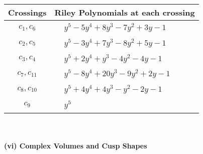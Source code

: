 \documentclass[1p]{elsarticle_modified}
\theoremstyle{definition}
\begin{document}
\begin{tabular}{m{50pt}|m{274pt}}
Crossings & \hspace{64pt}Riley Polynomials at each crossing \\
\hline $$\begin{aligned}c_{1},c_{6}\end{aligned}$$&$\begin{aligned}
&y^5-5 y^4+8 y^3-7 y^2+3 y-1
\end{aligned}$\\
\hline $$\begin{aligned}c_{2},c_{5}\end{aligned}$$&$\begin{aligned}
&y^5-3 y^4+7 y^3-8 y^2+5 y-1
\end{aligned}$\\
\hline $$\begin{aligned}c_{3},c_{4}\end{aligned}$$&$\begin{aligned}
&y^5+2 y^4+y^3-4 y^2-4 y-1
\end{aligned}$\\
\hline $$\begin{aligned}c_{7},c_{11}\end{aligned}$$&$\begin{aligned}
&y^5-8 y^4+20 y^3-9 y^2+2 y-1
\end{aligned}$\\
\hline $$\begin{aligned}c_{8},c_{10}\end{aligned}$$&$\begin{aligned}
&y^5+4 y^4+4 y^3- y^2-2 y-1
\end{aligned}$\\
\hline $$\begin{aligned}c_{9}\end{aligned}$$&$\begin{aligned}
&y^5
\end{aligned}$\\
\hline
\end{tabular}\\~\\
\newpage\flushleft \textbf{(vi) Complex Volumes and Cusp Shapes}
\end{document}
